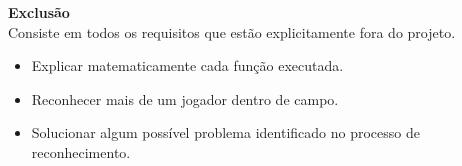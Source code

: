 \textbf{Exclusão} \\
Consiste em todos os requisitos que estão explicitamente fora do projeto.
\begin{itemize}
\raggedright \item Explicar matematicamente cada função executada.

\raggedright \item Reconhecer mais de um jogador dentro de campo.

\raggedright \item Solucionar algum possível problema identificado no processo de reconhecimento.
\end{itemize}